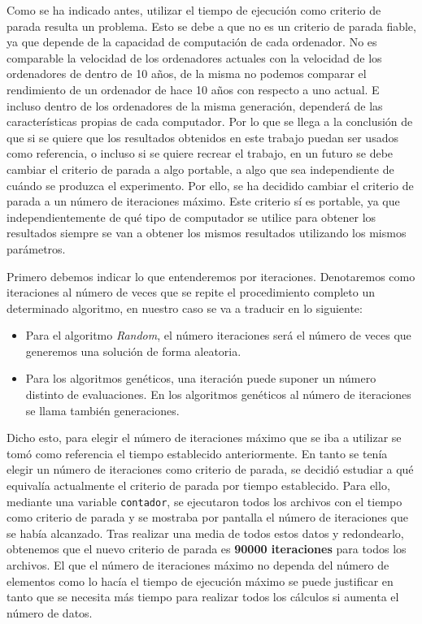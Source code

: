 Como se ha indicado antes, utilizar el tiempo de ejecución como criterio de parada resulta un problema. 
Esto se debe a que no es un criterio de parada fiable, ya que depende de la capacidad de computación de cada ordenador. 
No es comparable la velocidad de los ordenadores actuales con la velocidad de los ordenadores de dentro de 10 años, de la misma no podemos comparar el rendimiento de un ordenador de hace 10 años con respecto a uno actual. 
E incluso dentro de los ordenadores de la misma generación, dependerá de las características propias de cada computador. 
Por lo que se llega a la conclusión de que si se quiere que los resultados obtenidos en este trabajo puedan ser usados como referencia, o incluso si se quiere recrear el trabajo, en un futuro se debe cambiar el criterio de parada a algo portable, a algo que sea independiente de cuándo se produzca el experimento. 
Por ello, se ha decidido cambiar el criterio de parada a un número de iteraciones máximo. 
Este criterio sí es portable, ya que independientemente de qué tipo de computador se utilice para obtener los resultados siempre se van a obtener los mismos resultados utilizando los mismos parámetros.

Primero debemos indicar lo que entenderemos por iteraciones. 
Denotaremos como iteraciones al número de veces que se repite el procedimiento completo un determinado algoritmo, en nuestro caso se va a traducir en lo siguiente: 
\begin{itemize}
	\item Para el algoritmo \textit{Random}, el número iteraciones será el número de veces que generemos una solución de forma aleatoria.
	\item Para los algoritmos genéticos, una iteración puede suponer un número distinto de evaluaciones. 
	En los algoritmos genéticos al número de iteraciones se llama también generaciones.
\end{itemize}

Dicho esto, para elegir el número de iteraciones máximo que se iba a utilizar se tomó como referencia el tiempo establecido anteriormente. 
En tanto se tenía elegir un número de iteraciones como criterio de parada, se decidió estudiar a qué equivalía actualmente el criterio de parada por tiempo establecido. 
Para ello, mediante una variable \texttt{contador}, se ejecutaron todos los archivos con el tiempo como criterio de parada y se mostraba por pantalla el número de iteraciones que se había alcanzado. 
Tras realizar una media de todos estos datos y redondearlo, obtenemos que el nuevo criterio de parada es \textbf{90000 iteraciones} para todos los archivos. 
El que el número de iteraciones máximo no dependa del número de elementos como lo hacía el tiempo de ejecución máximo se puede justificar en tanto que se necesita más tiempo para realizar todos los cálculos si aumenta el número de datos. 

